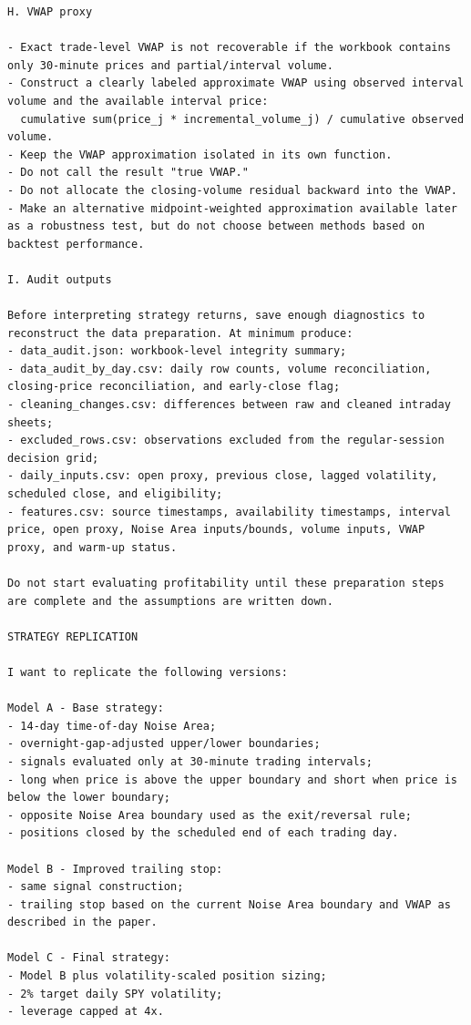 \documentclass{article}
\begin{document}
\begin{lstlisting}
H. VWAP proxy

- Exact trade-level VWAP is not recoverable if the workbook contains only 30-minute prices and partial/interval volume.
- Construct a clearly labeled approximate VWAP using observed interval volume and the available interval price:
  cumulative sum(price_j * incremental_volume_j) / cumulative observed volume.
- Keep the VWAP approximation isolated in its own function.
- Do not call the result "true VWAP."
- Do not allocate the closing-volume residual backward into the VWAP.
- Make an alternative midpoint-weighted approximation available later as a robustness test, but do not choose between methods based on backtest performance.

I. Audit outputs

Before interpreting strategy returns, save enough diagnostics to reconstruct the data preparation. At minimum produce:
- data_audit.json: workbook-level integrity summary;
- data_audit_by_day.csv: daily row counts, volume reconciliation, closing-price reconciliation, and early-close flag;
- cleaning_changes.csv: differences between raw and cleaned intraday sheets;
- excluded_rows.csv: observations excluded from the regular-session decision grid;
- daily_inputs.csv: open proxy, previous close, lagged volatility, scheduled close, and eligibility;
- features.csv: source timestamps, availability timestamps, interval price, open proxy, Noise Area inputs/bounds, volume inputs, VWAP proxy, and warm-up status.

Do not start evaluating profitability until these preparation steps are complete and the assumptions are written down.

STRATEGY REPLICATION

I want to replicate the following versions:

Model A - Base strategy:
- 14-day time-of-day Noise Area;
- overnight-gap-adjusted upper/lower boundaries;
- signals evaluated only at 30-minute trading intervals;
- long when price is above the upper boundary and short when price is below the lower boundary;
- opposite Noise Area boundary used as the exit/reversal rule;
- positions closed by the scheduled end of each trading day.

Model B - Improved trailing stop:
- same signal construction;
- trailing stop based on the current Noise Area boundary and VWAP as described in the paper.

Model C - Final strategy:
- Model B plus volatility-scaled position sizing;
- 2% target daily SPY volatility;
- leverage capped at 4x.


\end{lstlisting}
\end{document}
